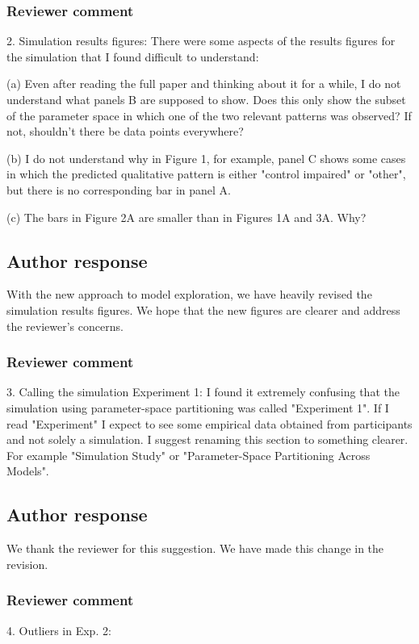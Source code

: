 \documentclass[12pt]{article}
\begin{document}
\subsubsection{Reviewer comment}
2. Simulation results figures: There were some aspects of
the results figures for the simulation that I found
difficult to understand:

(a) Even after reading the full paper and thinking about it
for a while, I do not understand what panels B are supposed
to show. Does this only show the subset of the parameter
space in which one of the two relevant patterns was
observed? If not, shouldn't there be data points everywhere?

(b) I do not understand why in Figure 1, for example, panel
C shows some cases in which the predicted qualitative
pattern is either "control impaired" or "other", but there
is no corresponding bar in panel A.

(c) The bars in Figure 2A are smaller than in Figures 1A and
3A. Why?

\subsection{Author response}
With the new approach to model exploration, we have heavily 
revised the simulation results figures.  We hope that the
new figures are clearer and address the reviewer's concerns.

\subsubsection{Reviewer comment}
3. Calling the simulation Experiment 1: I found it extremely
confusing that the simulation using parameter-space
partitioning was called "Experiment 1". If I read
"Experiment" I expect to see some empirical data obtained
from participants and not solely a simulation. I suggest
renaming this section to something clearer. For example
"Simulation Study" or "Parameter-Space Partitioning Across
Models".

\subsection{Author response}
We thank the reviewer for this suggestion. We have made this
change in the revision.

\subsubsection{Reviewer comment}
4. Outliers in Exp. 2:
\end{document}
